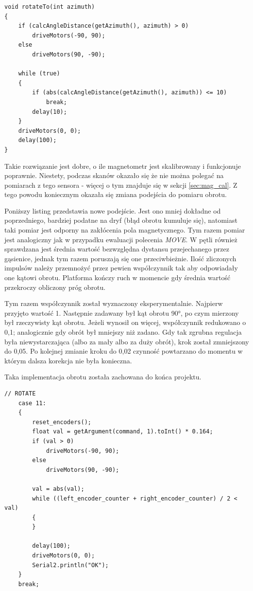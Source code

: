 \begin{lstlisting}[basicstyle=\footnotesize\ttfamily]
void rotateTo(int azimuth)
{
    if (calcAngleDistance(getAzimuth(), azimuth) > 0)
        driveMotors(-90, 90);
    else
        driveMotors(90, -90);

    while (true)
    {
        if (abs(calcAngleDistance(getAzimuth(), azimuth)) <= 10)
            break;
        delay(10);
    }
    driveMotors(0, 0);
    delay(100);
}
\end{lstlisting}

Takie rozwiązanie jest dobre, o ile magnetometr jest skalibrowany i funkcjonuje poprawnie. Niestety, podczas skanów okazało się że nie można polegać na pomiarach z tego sensora - więcej o tym znajduje się w sekcji \ref{sec:mag_cal}. Z tego powodu koniecznym okazała się zmiana podejścia do pomiaru obrotu.

Poniższy listing przedstawia nowe podejście. Jest ono mniej dokładne od poprzedniego, bardziej podatne na dryf (błąd obrotu kumuluje się), natomiast taki pomiar jest odporny na zakłócenia pola magnetycznego.
Tym razem pomiar jest analogiczny jak w przypadku ewaluacji polecenia \emph{MOVE}. W pętli również sprawdzana jest średnia wartość bezwzględna dystansu przejechanego przez gąsienice, jednak tym razem poruszają się one przeciwbieżnie. Ilość zliczonych impulsów należy przemnożyć przez pewien współczynnik tak aby odpowiadały one kątowi obrotu. Platforma kończy ruch w momencie gdy średnia wartość przekroczy obliczony próg obrotu.

Tym razem współczynnik został wyznaczony eksperymentalnie. Najpierw przyjęto wartość 1. Następnie zadawany był kąt obrotu 90°, po czym mierzony był rzeczywisty kąt obrotu. Jeżeli wynosił on więcej, współczynnik redukowano o 0,1; analogicznie gdy obrót był mniejszy niż zadano. Gdy tak zgrubna regulacja była niewystarczająca (albo za mały albo za duży obrót), krok został zmniejszony do 0,05. Po kolejnej zmianie kroku do 0,02 czynność powtarzano do momentu w którym dalsza korekcja nie była konieczna.

Taka implementacja obrotu została zachowana do końca projektu.

\begin{lstlisting}[basicstyle=\footnotesize\ttfamily]
// ROTATE
    case 11:
    {
        reset_encoders();
        float val = getArgument(command, 1).toInt() * 0.164;
        if (val > 0)
            driveMotors(-90, 90);
        else
            driveMotors(90, -90);

        val = abs(val);
        while ((left_encoder_counter + right_encoder_counter) / 2 < val)
        {
        }

        delay(100);
        driveMotors(0, 0);
        Serial2.println("OK");
    }
    break;
\end{lstlisting}

